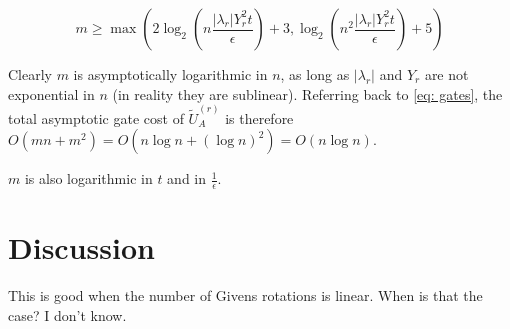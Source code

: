 \begin{equation}
    m \geq \max(2\log_2(n\frac{|\lambda_r|Y_r^2t}{\epsilon}) + 3, \log_2(n^2\frac{|\lambda_r|Y_r^2t}{\epsilon}) + 5)
\end{equation}

Clearly $m$ is asymptotically logarithmic in $n$, as long as $|\lambda_r|$ and $Y_r$ are not exponential in $n$ (in reality they are sublinear). Referring back to \eqref{eq: gates}, the total asymptotic gate cost of $\tilde{U}_A^{(r)}$ is therefore $O(mn + m^2) = O(n\log{n} + (\log{n})^2) = O(n\log{n})$.

$m$ is also logarithmic in $t$ and in $\frac{1}{\epsilon}$.

\section{Discussion}

This is good when the number of Givens rotations is linear. When is that the case? I don't know.



